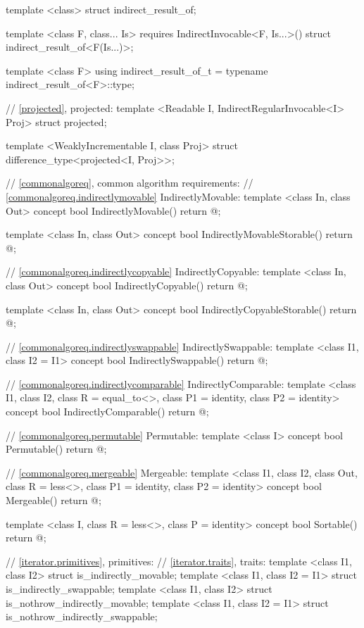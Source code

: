 \begin{codeblock}
{{{{  template <class> struct indirect_result_of;

  template <class F, class... Is>
    requires IndirectInvocable<F, Is...>()
  struct indirect_result_of<F(Is...)>;

  template <class F>
  using indirect_result_of_t
    = typename indirect_result_of<F>::type;

  // \ref{projected}, projected:
  template <Readable I, IndirectRegularInvocable<I> Proj>
  struct projected;

  template <WeaklyIncrementable I, class Proj>
  struct difference_type<projected<I, Proj>>;

  // \ref{commonalgoreq}, common algorithm requirements:
  // \ref{commonalgoreq.indirectlymovable} IndirectlyMovable:
  template <class In, class Out>
  concept bool IndirectlyMovable() {
    return @\seebelow@;
  }

  template <class In, class Out>
  concept bool IndirectlyMovableStorable() {
    return @\seebelow@;
  }

  // \ref{commonalgoreq.indirectlycopyable} IndirectlyCopyable:
  template <class In, class Out>
  concept bool IndirectlyCopyable() {
    return @\seebelow@;
  }

  template <class In, class Out>
  concept bool IndirectlyCopyableStorable() {
    return @\seebelow@;
  }

  // \ref{commonalgoreq.indirectlyswappable} IndirectlySwappable:
  template <class I1, class I2 = I1>
  concept bool IndirectlySwappable() {
    return @\seebelow@;
  }

  // \ref{commonalgoreq.indirectlycomparable} IndirectlyComparable:
  template <class I1, class I2, class R = equal_to<>, class P1 = identity,
      class P2 = identity>
  concept bool IndirectlyComparable() {
    return @\seebelow@;
  }

  // \ref{commonalgoreq.permutable} Permutable:
  template <class I>
  concept bool Permutable() {
    return @\seebelow@;
  }

  // \ref{commonalgoreq.mergeable} Mergeable:
  template <class I1, class I2, class Out,
      class R = less<>, class P1 = identity, class P2 = identity>
  concept bool Mergeable() {
    return @\seebelow@;
  }

  template <class I, class R = less<>, class P = identity>
  concept bool Sortable() {
    return @\seebelow@;
  }

  // \ref{iterator.primitives}, primitives:
  // \ref{iterator.traits}, traits:
  template <class I1, class I2> struct is_indirectly_movable;
  template <class I1, class I2 = I1> struct is_indirectly_swappable;
  template <class I1, class I2> struct is_nothrow_indirectly_movable;
  template <class I1, class I2 = I1> struct is_nothrow_indirectly_swappable;

}}}}
\end{codeblock}
